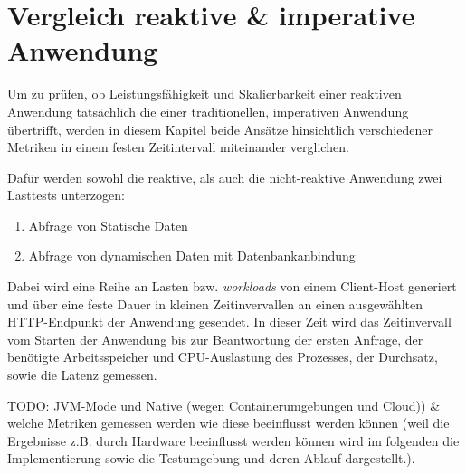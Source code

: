 \section {Vergleich reaktive \& imperative Anwendung}
\label{section:vergleich_reaktiv_imperativ}
Um zu prüfen, ob Leistungsfähigkeit und Skalierbarkeit einer reaktiven Anwendung tatsächlich die einer traditionellen, imperativen Anwendung
übertrifft, werden in diesem Kapitel beide Ansätze hinsichtlich verschiedener Metriken in einem festen Zeitintervall miteinander verglichen.

Dafür werden sowohl die reaktive, als auch die nicht-reaktive Anwendung zwei Lasttests unterzogen:
\begin{enumerate}
    \item Abfrage von Statische Daten 
    \item Abfrage von dynamischen Daten mit Datenbankanbindung
\end{enumerate}
Dabei wird eine Reihe an Lasten bzw. \textit{workloads} von einem Client-Host generiert und über eine feste Dauer in kleinen Zeitinvervallen
 an einen ausgewählten HTTP-Endpunkt der Anwendung gesendet.
In dieser Zeit wird das Zeitinvervall vom Starten der Anwendung bis zur Beantwortung der ersten Anfrage, 
der benötigte Arbeitsspeicher und CPU-Auslastung des Prozesses, der Durchsatz, sowie die Latenz gemessen.

TODO:
JVM-Mode und Native (wegen Containerumgebungen und Cloud))
\& welche Metriken gemessen werden wie diese beeinflusst werden können (weil die Ergebnisse z.B. durch Hardware beeinflusst werden können
wird im folgenden die Implementierung sowie die Testumgebung und deren Ablauf dargestellt.).

